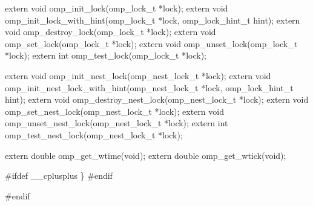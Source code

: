 {\begin{codepar}
extern void omp\_init\_lock(omp\_lock\_t *lock);
extern void omp\_init\_lock\_with\_hint(omp\_lock\_t *lock, 
                                   omp\_lock\_hint\_t hint);
extern void omp\_destroy\_lock(omp\_lock\_t *lock);
extern void omp\_set\_lock(omp\_lock\_t *lock);
extern void omp\_unset\_lock(omp\_lock\_t *lock);
extern int omp\_test\_lock(omp\_lock\_t *lock);

extern void omp\_init\_nest\_lock(omp\_nest\_lock\_t *lock);
extern void omp\_init\_nest\_lock\_with\_hint(omp\_nest\_lock\_t *lock, 
                                          omp\_lock\_hint\_t hint);
extern void omp\_destroy\_nest\_lock(omp\_nest\_lock\_t *lock);
extern void omp\_set\_nest\_lock(omp\_nest\_lock\_t *lock);
extern void omp\_unset\_nest\_lock(omp\_nest\_lock\_t *lock);
extern int omp\_test\_nest\_lock(omp\_nest\_lock\_t *lock);

extern double omp\_get\_wtime(void);
extern double omp\_get\_wtick(void);

\#ifdef _\_cplusplus
\}
\#endif

\#endif
\end{codepar}} %





